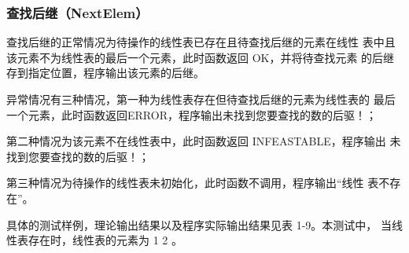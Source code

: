 \documentclass[supercite]{Experimental_Report}
\theoremstyle{definition}
\begin{document}
\subsubsection{查找后继（NextElem）}

查找后继的正常情况为待操作的线性表已存在且待查找后继的元素在线性
表中且该元素不为线性表的最后一个元素，此时函数返回 OK，并将待查找元素
的后继存到指定位置，程序输出该元素的后继。

异常情况有三种情况，第一种为线性表存在但待查找后继的元素为线性表的
最后一个元素，此时函数返回ERROR，程序输出未找到您要查找的数的后驱！；

第二种情况为该元素不在线性表中，此时函数返回 INFEASTABLE，程序输出
未找到您要查找的数的后驱！；

第三种情况为待操作的线性表未初始化，此时函数不调用，程序输出“线性
表不存在”。

具体的测试样例，理论输出结果以及程序实际输出结果见表 1-9。本测试中，
当线性表存在时，线性表的元素为 1 2 。
\end{document}
